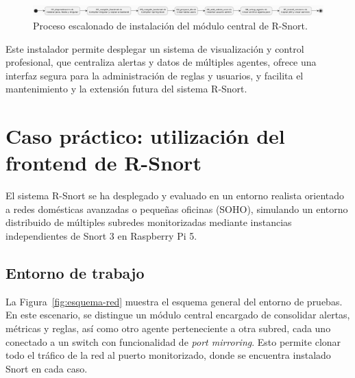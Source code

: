 \documentclass[11pt,a4paper,twoside]{report}
\begin{document}
\begin{figure}[ht]
	\centering
	\includegraphics[width=1\textwidth]{documento/15.png}
	\caption{Proceso escalonado de instalación del módulo central de R-Snort.}
	\label{fig:bpmn-snort-central}
\end{figure}

Este instalador permite desplegar un sistema de visualización y control profesional, que centraliza alertas y datos de múltiples agentes, ofrece una interfaz segura para la administración de reglas y usuarios, y facilita el mantenimiento y la extensión futura del sistema R-Snort.


\clearpage
\null
\thispagestyle{empty}
\newpage
\chapter{Caso práctico: utilización del frontend de R-Snort}

El sistema R-Snort se ha desplegado y evaluado en un entorno realista orientado a redes domésticas avanzadas o pequeñas oficinas (SOHO), simulando un entorno distribuido de múltiples subredes monitorizadas mediante instancias independientes de Snort 3 en Raspberry Pi 5.

\section{Entorno de trabajo}

La Figura~\ref{fig:esquema-red} muestra el esquema general del entorno de pruebas. En este escenario, se distingue un módulo central encargado de consolidar alertas, métricas y reglas, así como otro agente perteneciente a otra subred, cada uno conectado a un switch con funcionalidad de \textit{port mirroring}. Esto permite clonar todo el tráfico de la red al puerto monitorizado, donde se encuentra instalado Snort en cada caso.
\end{document}
